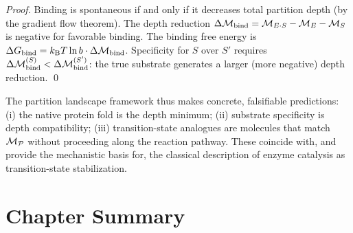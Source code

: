 \begin{proof}
Binding is spontaneous if and only if it decreases total partition depth
(by the gradient flow theorem). The depth reduction
$\Delta\mathcal{M}_{\mathrm{bind}} = \mathcal{M}_{E \cdot S} - \mathcal{M}_E - \mathcal{M}_S$
is negative for favorable binding. The binding free energy is
$\Delta G_{\mathrm{bind}} = k_{\mathrm{B}} T \ln b \cdot \Delta\mathcal{M}_{\mathrm{bind}}$.
Specificity for $S$ over $S'$ requires
$\Delta\mathcal{M}_{\mathrm{bind}}^{(S)} < \Delta\mathcal{M}_{\mathrm{bind}}^{(S')}$:
the true substrate generates a larger (more negative) depth reduction. \qed
\end{proof}

The partition landscape framework thus makes concrete, falsifiable predictions:
(i) the native protein fold is the depth minimum; (ii) substrate specificity is
depth compatibility; (iii) transition-state analogues are molecules that match
$\mathcal{M}_{\mathcal{P}}$ without proceeding along the reaction pathway. These
coincide with, and provide the mechanistic basis for, the classical
description of enzyme catalysis as transition-state stabilization.

\section*{Chapter Summary}
\label{sec:ch3_summary}

